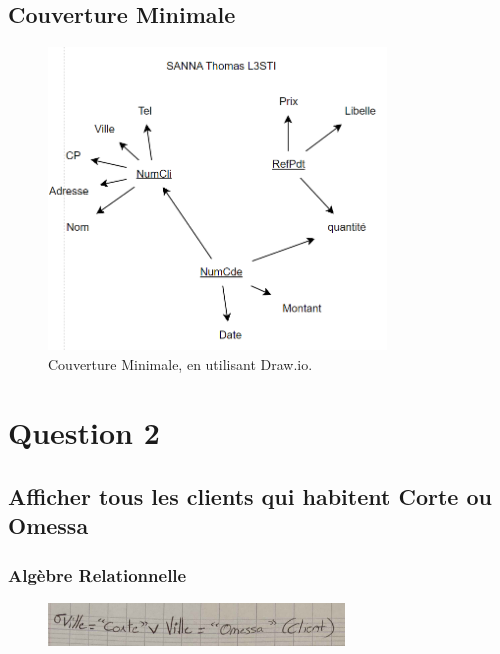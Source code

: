 \documentclass{article}
\begin{document}
\subsection{Couverture Minimale}

\begin{figure}[H]
  \centering
  \includegraphics[width=0.8\textwidth]{graphs/couv-mini.png}
  \caption{Couverture Minimale, en utilisant Draw.io.}
  \label{fig:CM}
\end{figure}

\break\section{Question 2}

\subsection{Afficher tous les clients qui habitent Corte ou Omessa}

\subsubsection{Algèbre Relationnelle}

\begin{figure}[H]
  \centering
  \includegraphics[width=0.7\textwidth]{alg/1.png}
  \label{fig:alg-rel}
\end{figure}
\end{document}
